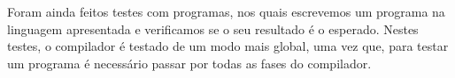 Foram ainda feitos testes com programas, nos quais escrevemos um programa na linguagem apresentada e verificamos se o seu resultado é o esperado. Nestes testes, o compilador é testado de um modo mais global, uma vez que, para testar um programa é necessário passar por todas as fases do compilador.




